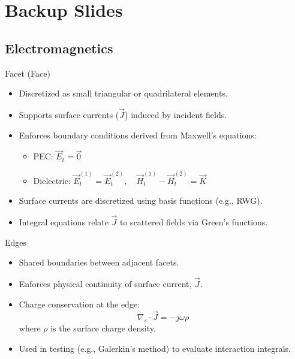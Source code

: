 % 

\section{Backup Slides}

\subsection{Electromagnetics}
\begin{frame}{Facet (Face)}
    \begin{itemize}
        \item Discretized as small triangular or quadrilateral elements.
        \item Supports surface currents (\(\vec{J}\)) induced by incident fields.
        \item Enforces boundary conditions derived from Maxwell’s equations:
            \begin{itemize}
                \item PEC: \(\vec{E}_t = \vec{0}\)
                \item Dielectric: \(\vec{E}_t^{(1)} = \vec{E}_t^{(2)}, \quad \vec{H}_t^{(1)} - \vec{H}_t^{(2)} = \vec{K}\)
            \end{itemize}
        \item Surface currents are discretized using basis functions (e.g., RWG).
        \item Integral equations relate \(\vec{J}\) to scattered fields via Green’s functions.
    \end{itemize}
\end{frame}

\begin{frame}{Edges}
    \begin{itemize}
        \item Shared boundaries between adjacent facets.
        \item Enforces physical continuity of surface current, \(\vec{J}\).
        \item Charge conservation at the edge:
        \begin{equation}
             \nabla_s \cdot \vec{J} = -j\omega \rho
             \label{eq:grad}
          \end{equation}
            where \(\rho\) is the surface charge density.
        \item Used in testing (e.g., Galerkin’s method) to evaluate interaction integrals.
    \end{itemize}
\end{frame}

